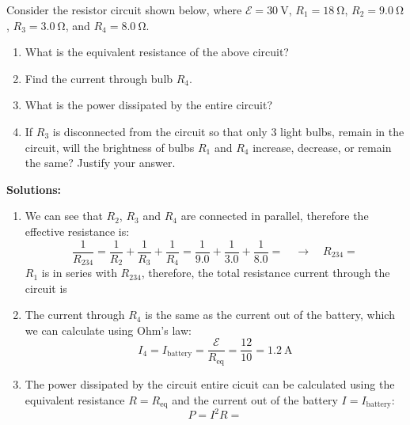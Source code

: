 \begin{example}
  Consider the resistor circuit shown below, where $\mathcal E=\SI{30}\volt$,
  $R_1=\SI{18}\ohm$, $R_2=\SI{9.0}\ohm$, $R_3=\SI{3.0}\ohm$, and
  $R_4=\SI{8.0}\ohm$.

  \begin{minipage}{.43\linewidth}
  \end{minipage}
  \begin{minipage}{.55\linewidth}
    \begin{enumerate}
    \item What is the equivalent resistance of the above circuit?
    \item Find the current through bulb $R_4$.
    \item What is the power dissipated by the entire circuit?
    \item If $R_3$ is disconnected from the circuit so that only 3 light bulbs,
      remain in the circuit, will the brightness of bulbs $R_1$ and $R_4$
      increase, decrease, or remain the same? Justify your answer.
    \end{enumerate}
  \end{minipage}
  
  \vspace{.2in}\textbf{Solutions:}
  \begin{enumerate}
  \item We can see that $R_2$, $R_3$ and $R_4$ are connected in parallel,
    therefore the effective resistance is:
    \begin{displaymath}
      \frac1{R_{234}}
      =\frac1{R_2}+\frac1{R_3}+\frac1{R_4}
      =\frac1{9.0}+\frac1{3.0}+\frac1{8.0}=
      \quad\longrightarrow\quad R_{234}=
    \end{displaymath}
    $R_1$ is in series with $R_{234}$, therefore, the total resistance current
    through the circuit is
  \item The current through $R_4$ is the same as the current out of the battery,
    which we can calculate using Ohm's law:
    \begin{displaymath}
      I_4=I_\text{battery}=\frac{\mathcal E}{R_\text{eq}}=\frac{12}{10}
      =\SI{1.2}\ampere
    \end{displaymath}
  \item The power dissipated by the circuit entire cicuit can be calculated
    using the equivalent resistance $R=R_\text{eq}$ and the current out of the
    battery $I=I_\text{battery}$:
    \begin{displaymath}
      P = I^2R=
    \end{displaymath}
  \end{enumerate}
\end{example}
